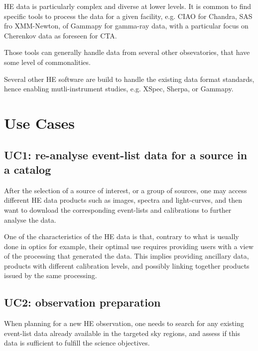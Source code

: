 \documentclass[11pt,a4paper]{ivoa}
\begin{document}
HE data is particularly complex and diverse at lower levels. It is common to find specific tools to process the data for a given facility, e.g. CIAO for Chandra, SAS fro XMM-Newton, of Gammapy for gamma-ray data, with a particular focus on Cherenkov data as foreseen for CTA.

Those tools can generally handle data from several other obsevatories, that have some level of commonalities.

Several other HE software are build to handle the existing data format standards, hence enabling mutli-instrument studies, e.g. XSpec, Sherpa, or Gammapy.





\section{Use Cases}

\subsection{UC1: re-analyse event-list data for a source in a catalog}

After the selection of a source of interest, or a group of sources, one may access different HE data products such as images, spectra and light-curves, and then want to download the corresponding event-lists and calibrations to further analyse the data.

One of the characteristics of the HE data is that, contrary to what is usually done in optics for example, their optimal use requires providing users with a view of the processing that generated the data. This implies providing ancillary data, products with different calibration levels, and possibly linking together products issued by the same processing.


\subsection{UC2: observation preparation}

When planning for a new HE observation, one needs to search for any existing event-list data already available in the targeted sky regions, and assess if this data is sufficient to fulfill the science objectives.
\end{document}
